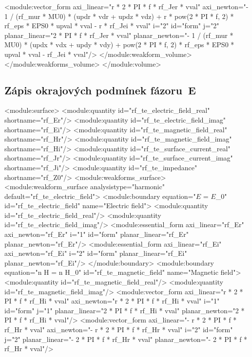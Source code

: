 \documentclass[12pt,a4paper,oneside]{article}
\numberwithin{equation}{section} %
\numberwithin{figure}{section} %
\numberwithin{table}{section} %
\newcommand{\vecfaz}[1]{\mbox{\underline{\boldmath$#1$}}} %
\begin{document}
\begin{spverbatim}
        <module:vector_form axi_linear="r * 2 * PI * f * rf_Jer * vval" axi_newton="- 1 / (rf_mur * MU0) * (updr * vdr + updz * vdz) + r * pow(2 * PI * f, 2) * rf_eps * EPS0 * upval * vval - r * rf_Jei * vval" i="2" id="form" j="2" planar_linear="2 * PI * f * rf_Jer * vval" planar_newton="- 1 / (rf_mur * MU0) * (updx * vdx + updy * vdy) + pow(2 * PI * f, 2) * rf_eps * EPS0 * upval * vval - rf_Jei * vval"/>
      </module:weakform_volume>
    </module:weakforms_volume>
  </module:volume>
\end{spverbatim}


\subsection*{Zápis okrajových podmínek fázoru~E}
\label{xmlEs}

\begin{spverbatim}
 <module:surface>
    <module:quantity id="rf_te_electric_field_real" shortname="rf_Er"/>
    <module:quantity id="rf_te_electric_field_imag" shortname="rf_Ei"/>
    <module:quantity id="rf_te_magnetic_field_real" shortname="rf_Hr"/>
    <module:quantity id="rf_te_magnetic_field_imag" shortname="rf_Hi"/>
    <module:quantity id="rf_te_surface_current_real" shortname="rf_Jr"/>
    <module:quantity id="rf_te_surface_current_imag" shortname="rf_Ji"/>
    <module:quantity id="rf_te_impedance" shortname="rf_Z0"/>
    <module:weakforms_surface>
      <module:weakform_surface analysistype="harmonic" default="rf_te_electric_field">
        <module:boundary equation="\vecfaz{E} = \vecfaz{E}_0" id="rf_te_electric_field" name="Electric field">
          <module:quantity id="rf_te_electric_field_real"/>
          <module:quantity id="rf_te_electric_field_imag"/>
          <module:essential_form axi_linear="rf_Er" axi_newton="rf_Er" i="1" id="form" planar_linear="rf_Er" planar_newton="rf_Er"/>
          <module:essential_form axi_linear="rf_Ei" axi_newton="rf_Ei" i="2" id="form" planar_linear="rf_Ei" planar_newton="rf_Ei"/>
        </module:boundary>
        <module:boundary equation="n \times H = n \times H_0" id="rf_te_magnetic_field" name="Magnetic field">
          <module:quantity id="rf_te_magnetic_field_real"/>
          <module:quantity id="rf_te_magnetic_field_imag"/>
          <module:vector_form axi_linear="r * 2 * PI * f * rf_Hi * vval" axi_newton="r * 2 * PI * f * rf_Hi * vval" i="1" id="form" j="1" planar_linear="2 * PI * f * rf_Hi * vval" planar_newton="2 * PI * f * rf_Hi * vval"/>
          <module:vector_form axi_linear="- r * 2 * PI * f * rf_Hr * vval" axi_newton="- r * 2 * PI * f * rf_Hr * vval" i="2" id="form" j="2" planar_linear="- 2 * PI * f * rf_Hr * vval" planar_newton="- 2 * PI * f * rf_Hr * vval"/>

\end{spverbatim}
\end{document}
